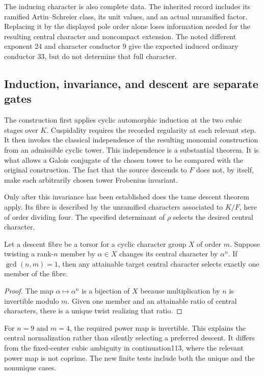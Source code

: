 The inducing character is also complete data. The inherited record includes its ramified Artin--Schreier class, its unit values, and an actual unramified factor. Replacing it by the displayed pole order alone loses information needed for the resulting central character and noncompact extension. The noted different exponent $24$ and character conductor $9$ give the expected induced ordinary conductor $33$, but do not determine that full character.

\subsection{Induction, invariance, and descent are separate gates}
The construction first applies cyclic automorphic induction at the two cubic stages over $K$. Cuspidality requires the recorded regularity at each relevant step. It then invokes the classical independence of the resulting monomial construction from an admissible cyclic tower. This independence is a substantial theorem. It is what allows a Galois conjugate of the chosen tower to be compared with the original construction. The fact that the source descends to $F$ does not, by itself, make each arbitrarily chosen tower Frobenius invariant.

Only after this invariance has been established does the tame descent theorem apply. Its fibre is described by the unramified characters associated to $K/F$, here of order dividing four. The specified determinant of $\rho$ selects the desired central character.

\begin{lemma}\label{lem:descent}
Let a descent fibre be a torsor for a cyclic character group $X$ of order $m$. Suppose twisting a rank-$n$ member by $\alpha\in X$ changes its central character by $\alpha^n$. If $\gcd(n,m)=1$, then any attainable target central character selects exactly one member of the fibre.
\end{lemma}
\begin{proof}
The map $\alpha\mapsto\alpha^n$ is a bijection of $X$ because multiplication by $n$ is invertible modulo $m$. Given one member and an attainable ratio of central characters, there is a unique twist realizing that ratio.
\end{proof}

For $n=9$ and $m=4$, the required power map is invertible. This explains the central normalization rather than silently selecting a preferred descent. It differs from the fixed-center cubic ambiguity in continuation113, where the relevant power map is not coprime. The new finite tests include both the unique and the nonunique cases.

